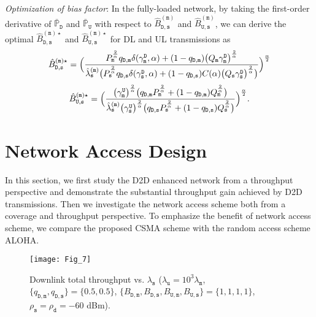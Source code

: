 \documentclass[twocolumn,english]{IEEEtran}
\theoremstyle{plain}
\theoremstyle{definition}
\begin{document}
\emph{Optimization of bias factor}: In the fully-loaded network, by
taking the first-order derivative of $\bar{\mathbb{P}}_{\mathtt{D}}$
and $\bar{\mathbb{P}}_{\mathtt{U}}$ with respect to $\hat{B}_{\mathtt{D,s}}^{(\mathtt{m})}$
and $\hat{B}_{\mathtt{U,s}}^{(\mathtt{m})}$, we can derive the optimal
$\hat{B}_{\mathtt{D,s}}^{(\mathtt{m})\star}$ and $\hat{B}_{\mathtt{U,s}}^{(\mathtt{m})\star}$
for DL and UL transmissions as
\begin{equation}
\hat{B}_{\mathtt{D,s}}^{(\mathtt{m})\star}=\Bigl(\frac{P_{\mathtt{m}}^{\frac{2}{\alpha}}q_{\mathtt{D,m}}\delta(\gamma_{\mathtt{m}}^{\mathtt{D}},\alpha)+(1-q_{\mathtt{D,m}})\bigl(Q_{\mathtt{m}}\gamma_{\mathtt{m}}^{\mathtt{D}}\bigr)^{\frac{2}{\alpha}}}{\hat{\lambda}_{\mathtt{s}}^{(\mathtt{m})}\bigl(P_{\mathtt{s}}^{\frac{2}{\alpha}}q_{\mathtt{D,s}}\delta(\gamma_{\mathtt{s}}^{\mathtt{D}},\alpha)+(1-q_{\mathtt{D,s}})C(\alpha)\bigl(Q_{\mathtt{s}}\gamma_{\mathtt{s}}^{\mathtt{D}}\bigr)^{\frac{2}{\alpha}}\bigr)}\Bigr)^{\frac{\alpha}{2}}\label{eq:Op_bias_D}
\end{equation}
\begin{equation}
\hat{B}_{\mathtt{U,s}}^{(\mathtt{m})\star}=\Bigl(\frac{\bigl(\gamma_{\mathtt{m}}^{\mathtt{U}}\bigr)^{\frac{2}{\alpha}}\bigl(q_{\mathtt{D,m}}P_{\mathtt{m}}^{\frac{2}{\alpha}}+(1-q_{\mathtt{D,m}})Q_{\mathtt{m}}^{\frac{2}{\alpha}}\bigr)}{\hat{\lambda}_{\mathtt{s}}^{(\mathtt{m})}\bigl(\gamma_{\mathtt{s}}^{\mathtt{U}}\bigr)^{\frac{2}{\alpha}}\bigl(q_{\mathtt{D,s}}P_{\mathtt{s}}^{\frac{2}{\alpha}}+(1-q_{\mathtt{D,s}})Q_{\mathtt{s}}^{\frac{2}{\alpha}}\bigr)}\Bigr)^{\frac{\alpha}{2}}.\label{eq:Op_bias_U}
\end{equation}



\section{Network Access Design }

In this section, we first study the D2D enhanced network from a throughput
perspective and demonstrate the substantial throughput gain achieved
by D2D transmissions. Then we investigate the network access scheme
both from a coverage and throughput perspective. To emphasize the
benefit of network access scheme, we compare the proposed CSMA scheme
with the random access scheme ALOHA.

\begin{figure}[t]
\centering\texttt{[image: Fig\_7]}

\protect\caption{\label{fig:Thrpt_dens}Downlink total throughput vs. $\lambda_{\mathtt{s}}$
($\lambda_{\mathtt{u}}=10^{3}\lambda_{\mathtt{m}}$, $\{q_{\mathtt{D,m}},q_{\mathtt{D,s}}\}=\{0.5,0.5\}$,
$\{B_{\mathtt{D,m}},B_{\mathtt{D,s}},B_{\mathtt{U,m}},B_{\mathtt{U,s}}\}=\{1,1,1,1\}$,
$\rho_{\mathtt{s}}=\rho_{\mathtt{d}}=-60$ dBm). }
\end{figure}
\end{document}
